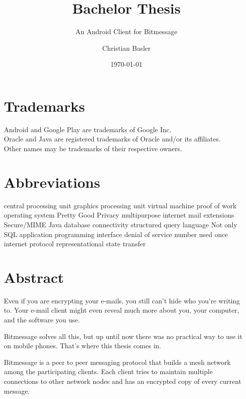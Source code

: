 \documentclass{bfh}
\title{Bachelor Thesis}
\subtitle{An Android Client for Bitmessage}
\author{Christian Basler}
\date{\today}
\begin{document}
  \lstset{language=Java}
  \maketitle

  \section*{Trademarks}
  Android and Google Play are trademarks of Google Inc.\\
  Oracle and Java are registered trademarks of Oracle and/or its affiliates.\\
  Other names may be trademarks of their respective owners.

  \section*{Abbreviations}
  \begin{acronym}[S/MIME ]
        {central processing unit}
        {graphics processing unit}
         {virtual machine}
        {proof of work}
         {operating system}
        {Pretty Good Privacy}
       {multipurpose internet mail extensions}
     {Secure/\acs{MIME}}
       {Java database connectivity}
        {structured query language}
      {Not only \acs{SQL}}
        {application programming interface}
        {denial of service}
      {number used once}
         {internet protocol}
       {representational state transfer}
  \end{acronym}


  \newpage
  \section*{Abstract}
  Even if you are encrypting your e-mails, you still can't hide who you're writing to. Your e-mail client might even reveal much more about you, your computer, and the software you use.

  Bitmessage solves all this, but up until now there was no practical way to use it on mobile phones. That's where this thesis comes in.


  Bitmessage is a peer to peer messaging protocol that builds a mesh network among the participating clients. Each client tries to maintain multiple connections to other network nodes and has an encrypted copy of every current message.
\end{document}
